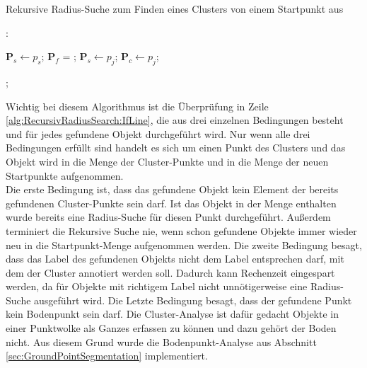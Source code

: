 \begin{algorithm}
  \caption{Rekursive Radius-Suche zum Finden eines Clusters von einem Startpunkt aus}
\label{alg:RecursivRadiusSearch}
  \begin{algorithmic}[1]
  	\State {}:
   	
	\State $\textbf{P}_{s} \gets p_s$;   	
    	\State $\textbf{P}_{f}$ = ;
			 \label{alg:RecursivRadiusSearch:IfLine}
				\State $\textbf{P}_s \gets p_j$;
				\State $\textbf{P}_c \gets p_j$;
			\EndIf
		 \EndFor
	\EndFor
	
		\State {};
	\EndIf
  \end{algorithmic}
\end{algorithm}

Wichtig bei diesem Algorithmus ist die Überprüfung in Zeile \ref{alg:RecursivRadiusSearch:IfLine}, die aus drei einzelnen Bedingungen besteht und für jedes gefundene Objekt durchgeführt wird. Nur wenn alle drei Bedingungen erfüllt sind handelt es sich um einen Punkt des Clusters und das Objekt wird in die Menge der Cluster-Punkte und in die Menge der neuen Startpunkte aufgenommen. \\

Die erste Bedingung ist, dass das gefundene Objekt kein Element der bereits gefundenen Cluster-Punkte sein darf. Ist das Objekt in der Menge enthalten wurde bereits eine Radius-Suche für diesen Punkt durchgeführt. Außerdem terminiert die Rekursive Suche nie, wenn schon gefundene Objekte immer wieder neu in die Startpunkt-Menge aufgenommen werden. Die zweite Bedingung besagt, dass das Label des gefundenen Objekts nicht dem Label entsprechen darf, mit dem der Cluster annotiert werden soll. Dadurch kann Rechenzeit eingespart werden, da für Objekte mit richtigem Label nicht unnötigerweise eine Radius-Suche ausgeführt wird. Die Letzte Bedingung besagt, dass der gefundene Punkt kein Bodenpunkt sein darf. Die Cluster-Analyse ist dafür gedacht Objekte in einer Punktwolke als Ganzes erfassen zu können und dazu gehört der Boden nicht. Aus diesem Grund wurde die Bodenpunkt-Analyse aus Abschnitt \ref{sec:GroundPointSegmentation} implementiert.\\

